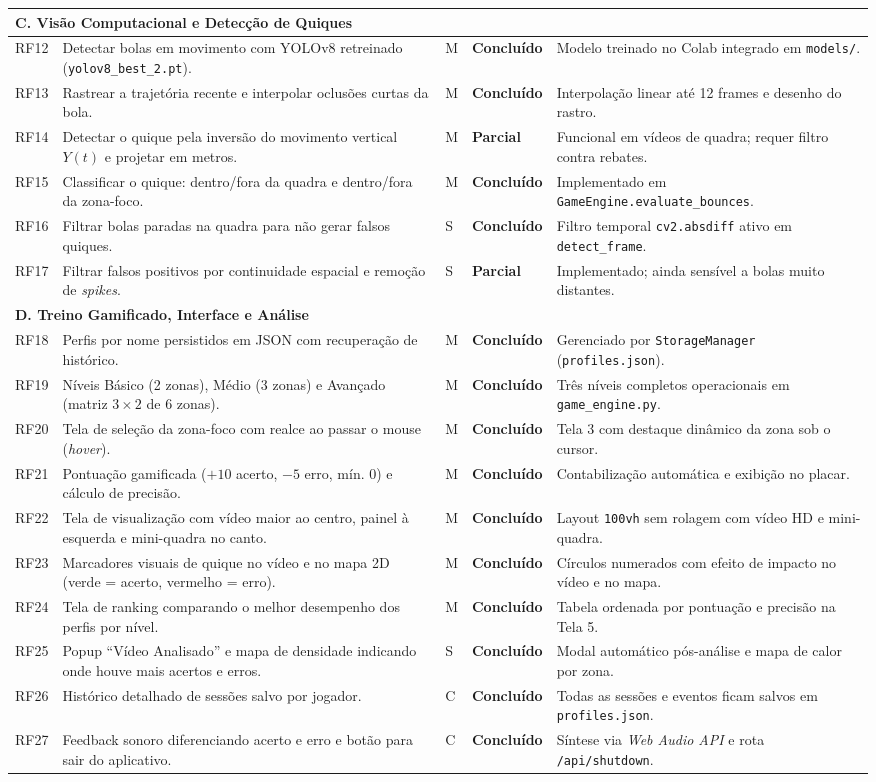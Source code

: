 \documentclass[a4paper,11pt]{article}
\newcommand{\stok}{\textcolor{acerto}{\textbf{Concluído}}}
\newcommand{\stpar}{\textcolor{parcial}{\textbf{Parcial}}}
\newcommand{\req}[5]{#1 & #2 & \centering #3 & \centering #4 & #5 \\ \hline}
\newcommand{\reccat}[1]{\multicolumn{5}{|l|}{\cellcolor{blue!14}\textbf{#1}} \\ \hline}
\begin{document}
\begin{center}
\begin{longtable}{|p{1.1cm}|p{6.8cm}|p{0.7cm}|p{1.6cm}|p{4.8cm}|}
\reccat{C. Visão Computacional e Detecção de Quiques}
\req{RF12}{Detectar bolas em movimento com YOLOv8 retreinado (\texttt{yolov8\_best\_2.pt}).}{M}{\stok}{Modelo treinado no Colab integrado em \texttt{models/}.}
\req{RF13}{Rastrear a trajetória recente e interpolar oclusões curtas da bola.}{M}{\stok}{Interpolação linear até 12 frames e desenho do rastro.}
\req{RF14}{Detectar o quique pela inversão do movimento vertical $Y(t)$ e projetar em metros.}{M}{\stpar}{Funcional em vídeos de quadra; requer filtro contra rebates.}
\req{RF15}{Classificar o quique: dentro/fora da quadra e dentro/fora da zona-foco.}{M}{\stok}{Implementado em \texttt{GameEngine.evaluate\_bounces}.}
\req{RF16}{Filtrar bolas paradas na quadra para não gerar falsos quiques.}{S}{\stok}{Filtro temporal \texttt{cv2.absdiff} ativo em \texttt{detect\_frame}.}
\req{RF17}{Filtrar falsos positivos por continuidade espacial e remoção de \textit{spikes}.}{S}{\stpar}{Implementado; ainda sensível a bolas muito distantes.}

\reccat{D. Treino Gamificado, Interface e Análise}
\req{RF18}{Perfis por nome persistidos em JSON com recuperação de histórico.}{M}{\stok}{Gerenciado por \texttt{StorageManager} (\texttt{profiles.json}).}
\req{RF19}{Níveis Básico (2 zonas), Médio (3 zonas) e Avançado (matriz $3\times 2$ de 6 zonas).}{M}{\stok}{Três níveis completos operacionais em \texttt{game\_engine.py}.}
\req{RF20}{Tela de seleção da zona-foco com realce ao passar o mouse (\textit{hover}).}{M}{\stok}{Tela 3 com destaque dinâmico da zona sob o cursor.}
\req{RF21}{Pontuação gamificada ($+10$ acerto, $-5$ erro, mín. 0) e cálculo de precisão.}{M}{\stok}{Contabilização automática e exibição no placar.}
\req{RF22}{Tela de visualização com vídeo maior ao centro, painel à esquerda e mini-quadra no canto.}{M}{\stok}{Layout \texttt{100vh} sem rolagem com vídeo HD e mini-quadra.}
\req{RF23}{Marcadores visuais de quique no vídeo e no mapa 2D (verde = acerto, vermelho = erro).}{M}{\stok}{Círculos numerados com efeito de impacto no vídeo e no mapa.}
\req{RF24}{Tela de ranking comparando o melhor desempenho dos perfis por nível.}{M}{\stok}{Tabela ordenada por pontuação e precisão na Tela 5.}
\req{RF25}{Popup ``Vídeo Analisado'' e mapa de densidade indicando onde houve mais acertos e erros.}{S}{\stok}{Modal automático pós-análise e mapa de calor por zona.}
\req{RF26}{Histórico detalhado de sessões salvo por jogador.}{C}{\stok}{Todas as sessões e eventos ficam salvos em \texttt{profiles.json}.}
\req{RF27}{Feedback sonoro diferenciando acerto e erro e botão para sair do aplicativo.}{C}{\stok}{Síntese via \textit{Web Audio API} e rota \texttt{/api/shutdown}.}


\end{longtable}
\end{center}
\end{document}
